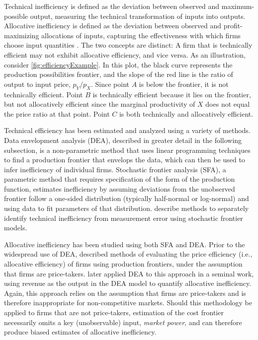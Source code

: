 \documentclass[twocolumn]{article}
\begin{document}
Technical inefficiency is defined as the deviation between observed and maximum-possible output, measuring the technical transformation of inputs into outputs. Allocative inefficiency is defined as the deviation between observed and profit-maximizing allocations of inputs, capturing the effectiveness with which firms choose input quantities \citep{AignerLovellSchmidt}. The two concepts are distinct: A firm that is technically efficient may not exhibit allocative efficiency, and vice versa. As an illustration, consider \cref{fig:efficiencyExample}. In this plot, the black curve represents the production possibilities frontier, and the slope of the red line is the ratio of output to input price, $p_Y/p_X$. Since point $A$ is below the frontier, it is not technically efficient. Point $B$ is technically efficient because it lies on the frontier, but not allocatively efficient since the marginal productivity of $X$ does not equal the price ratio at that point. Point $C$ is both technically and allocatively efficient.

Technical efficiency has been estimated and analyzed using a variety of methods. Data envelopment analysis (DEA), described in greater detail in the following subsection, is a non-parametric method that uses linear programming techniques to find a production frontier that envelops the data, which can then be used to infer inefficiency of individual firms. Stochastic frontier analysis (SFA), a parametric method that requires specification of the form of the production function, estimates inefficiency by assuming deviations from the unobserved frontier follow a one-sided distribution (typically half-normal or log-normal) and using data to fit parameters of that distribution. \cite{AignerLovellSchmidt} describe methods to separately identify technical inefficiency from measurement error using stochastic frontier models.

Allocative inefficiency has been studied using both SFA and DEA. Prior to the widespread use of DEA, \cite{Farrell} described methods of evaluating the price efficiency (i.e., allocative efficiency) of firms using production frontiers, under the assumption that firms are price-takers. \cite{Fare1985} later applied DEA to this approach in a seminal work, using revenue as the output in the DEA model to quantify allocative inefficiency. Again, this approach relies on the assumption that firms are price-takers and is therefore inappropriate for non-competitive markets. Should this methodology be applied to firms that are not price-takers, estimation of the cost frontier necessarily omits a key (unobservable) input, \textit{market power}, and can therefore produce biased estimates of allocative inefficiency.
\end{document}
